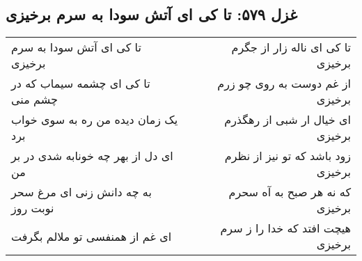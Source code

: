 \begin{center}
\section*{غزل ۵۷۹: تا کی ای آتش سودا به سرم برخیزی}
\label{sec:579}
\begin{longtable}{l p{0.5cm} r}
تا کی ای آتش سودا به سرم برخیزی
&&
تا کی ای ناله زار از جگرم برخیزی
\\
تا کی ای چشمه سیماب که در چشم منی
&&
از غم دوست به روی چو زرم برخیزی
\\
یک زمان دیده من ره به سوی خواب برد
&&
ای خیال ار شبی از رهگذرم برخیزی
\\
ای دل از بهر چه خونابه شدی در بر من
&&
زود باشد که تو نیز از نظرم برخیزی
\\
به چه دانش زنی ای مرغ سحر نوبت روز
&&
که نه هر صبح به آه سحرم برخیزی
\\
ای غم از همنفسی تو ملالم بگرفت
&&
هیچت افتد که خدا را ز سرم برخیزی
\\
\end{longtable}
\end{center}
